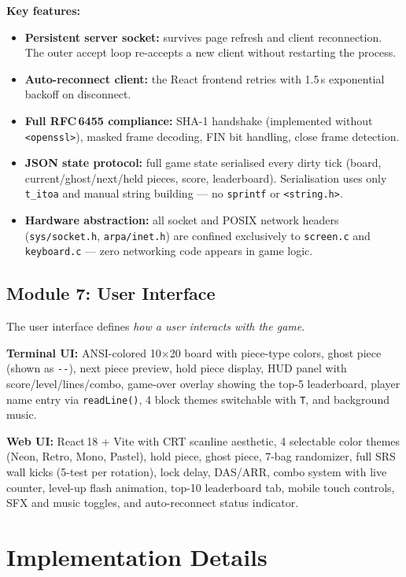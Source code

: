 \documentclass[conference]{IEEEtran}
\begin{document}
\textbf{Key features:}
\begin{itemize}
  \item \textbf{Persistent server socket:} survives page refresh and client reconnection. The outer accept loop re-accepts a new client without restarting the process.
  \item \textbf{Auto-reconnect client:} the React frontend retries with 1.5\,s exponential backoff on disconnect.
  \item \textbf{Full RFC\,6455 compliance:} SHA-1 handshake (implemented without \texttt{<openssl>}), masked frame decoding, FIN bit handling, close frame detection.
  \item \textbf{JSON state protocol:} full game state serialised every dirty tick (board, current/ghost/next/held pieces, score, leaderboard). Serialisation uses only \texttt{t\_itoa} and manual string building --- no \texttt{sprintf} or \texttt{<string.h>}.
  \item \textbf{Hardware abstraction:} all socket and POSIX network headers (\texttt{sys/socket.h}, \texttt{arpa/inet.h}) are confined exclusively to \texttt{screen.c} and \texttt{keyboard.c} --- zero networking code appears in game logic.
\end{itemize}

\subsection{Module 7: User Interface}
The user interface defines \textit{how a user interacts with the game}.

\textbf{Terminal UI:} ANSI-colored 10$\times$20 board with piece-type colors, ghost piece (shown as \texttt{-{}-}), next piece preview, hold piece display, HUD panel with score/level/lines/combo, game-over overlay showing the top-5 leaderboard, player name entry via \texttt{readLine()}, 4 block themes switchable with \texttt{T}, and background music.

\textbf{Web UI:} React\,18 + Vite with CRT scanline aesthetic, 4 selectable color themes (Neon, Retro, Mono, Pastel), hold piece, ghost piece, 7-bag randomizer, full SRS wall kicks (5-test per rotation), lock delay, DAS/ARR, combo system with live counter, level-up flash animation, top-10 leaderboard tab, mobile touch controls, SFX and music toggles, and auto-reconnect status indicator.

\section{Implementation Details}
\end{document}
